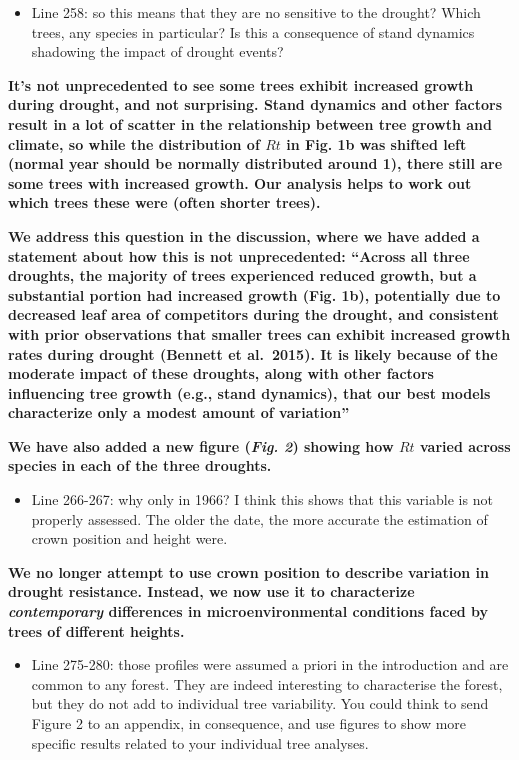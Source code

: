 \documentclass[
]{article}
\providecommand{\tightlist}{%
  \setlength{\itemsep}{0pt}\setlength{\parskip}{0pt}}
\begin{document}
\begin{itemize}
\tightlist
\item
  Line 258: so this means that they are no sensitive to the drought?
  Which trees, any species in particular? Is this a consequence of stand
  dynamics shadowing the impact of drought events?
\end{itemize}

\textbf{It's not unprecedented to see some trees exhibit increased
growth during drought, and not surprising. Stand dynamics and other
factors result in a lot of scatter in the relationship between tree
growth and climate, so while the distribution of \(Rt\) in Fig. 1b was
shifted left (normal year should be normally distributed around 1),
there still are some trees with increased growth. Our analysis helps to
work out which trees these were (often shorter trees).}

\textbf{We address this question in the discussion, where we have added
a statement about how this is not unprecedented: ``Across all three
droughts, the majority of trees experienced reduced growth, but a
substantial portion had increased growth (Fig. 1b), potentially due to
decreased leaf area of competitors during the drought, and consistent
with prior observations that smaller trees can exhibit increased growth
rates during drought (Bennett et al.~2015). It is likely because of the
moderate impact of these droughts, along with other factors influencing
tree growth (e.g., stand dynamics), that our best models characterize
only a modest amount of variation''}

\textbf{We have also added a new figure (\emph{Fig. 2}) showing how
\(Rt\) varied across species in each of the three droughts.}

\begin{itemize}
\tightlist
\item
  Line 266-267: why only in 1966? I think this shows that this variable
  is not properly assessed. The older the date, the more accurate the
  estimation of crown position and height were.
\end{itemize}

\textbf{We no longer attempt to use crown position to describe variation
in drought resistance. Instead, we now use it to characterize
\emph{contemporary} differences in microenvironmental conditions faced
by trees of different heights.}

\begin{itemize}
\tightlist
\item
  Line 275-280: those profiles were assumed a priori in the introduction
  and are common to any forest. They are indeed interesting to
  characterise the forest, but they do not add to individual tree
  variability. You could think to send Figure 2 to an appendix, in
  consequence, and use figures to show more specific results related to
  your individual tree analyses.
\end{itemize}
\end{document}
